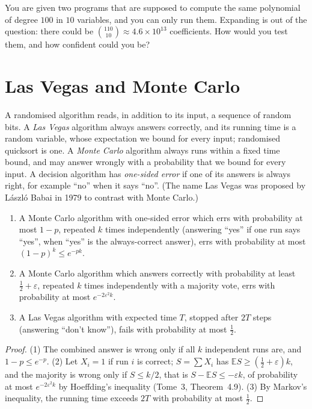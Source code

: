 \begin{think}
You are given two programs that are supposed to compute the same polynomial of degree $100$ in $10$ variables, and you can only run them. Expanding is out of the question: there could be
$\binom{110}{10}\approx4.6\times10^{13}$ coefficients. How would you test them, and how confident could you be?
\end{think}

\section{Las Vegas and Monte Carlo}\label{sec:lvmc}

A randomised algorithm reads, in addition to its input, a sequence of random bits. A \emph{Las Vegas} algorithm always answers correctly, and its running time is a random variable, whose
expectation we bound for every input; randomised quicksort is one. A \emph{Monte Carlo} algorithm always runs within a fixed time bound, and may answer wrongly with a probability that
we bound for every input. A decision algorithm has \emph{one-sided error} if one of its answers is always right, for example ``no'' when it says ``no''. (The name Las Vegas was proposed by L\'aszl\'o Babai in 1979 to
contrast with Monte Carlo.)

\begin{proposition}[amplification]\label{prop:amplify}
\begin{enumerate}
\item A Monte Carlo algorithm with one-sided error which errs with probability at most $1-p$, repeated $k$ times independently (answering ``yes'' if one run says ``yes'', when ``yes'' is the always-correct answer), errs with probability at most $(1-p)^k\le e^{-pk}$.
\item A Monte Carlo algorithm which answers correctly with probability at least $\tfrac12+\varepsilon$, repeated $k$ times independently with a majority vote, errs with probability at most $e^{-2\varepsilon^2k}$.
\item A Las Vegas algorithm with expected time $T$, stopped after $2T$ steps (answering ``don't know''), fails with probability at most $\tfrac12$.
\end{enumerate}
\end{proposition}
\begin{proof}
(1) The combined answer is wrong only if all $k$ independent runs are, and $1-p\le e^{-p}$. (2) Let $X_i=1$ if run $i$ is correct; $S=\sum X_i$ has $\mathbb ES\ge(\tfrac12+\varepsilon)k$, and the majority is wrong only if $S\le k/2$, that is
$S-\mathbb ES\le-\varepsilon k$, of probability at most $e^{-2\varepsilon^2k}$ by Hoeffding's inequality (Tome~3, Theorem~4.9). (3) By Markov's inequality, the running time exceeds $2T$ with probability at most $\tfrac12$.
\end{proof}

